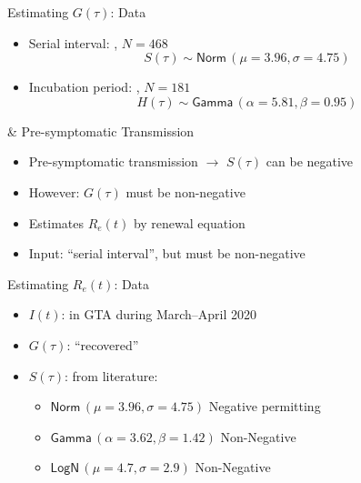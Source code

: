 \documentclass[aspectratio=169,professionalfonts]{beamer}
\begin{document}
\begin{frame}{Estimating $G(\tau)$: Data}
  \begin{itemize}
    \item Serial interval: \textcite{Du2020}, $N = 468$
    \begin{equation*}
      S(\tau) \sim \mathsf{Norm\,(\mu=3.96, \sigma=4.75)}
    \end{equation*}
    \item Incubation period: \textcite{Lauer2020}, $N = 181$
    \begin{equation*}
      H(\tau) \sim \mathsf{Gamma}\,(\alpha=5.81, \beta=0.95)
    \end{equation*}
  \end{itemize}
\end{frame}
\begin{frame}{\covid \& Pre-symptomatic Transmission}
  \begin{itemize}
    \item Pre-symptomatic transmission $\rightarrow$ $S(\tau)$ can be negative
    \item However: $G(\tau)$ must be non-negative
  \end{itemize}
  \pause
  \begin{itemize}
    \item Estimates $R_e(t)$ by renewal equation
    \item Input: ``serial interval'', but must be non-negative
  \end{itemize}
\end{frame}
\begin{frame}{Estimating $R_e(t)$: Data}
  \begin{itemize}
    \item $I(t)$: \covid in GTA during March--April 2020\\[1em]
    \pause
    \item $G(\tau)$: ``recovered''\\[1em]
    \item $S(\tau)$: from literature:
    \begin{itemize}
      \item $\mathsf{Norm\,(\mu=3.96, \sigma=4.75)}$    \textcite{Du2020}Negative permitting
      \item $\mathsf{Gamma\,(\alpha=3.62, \beta=1.42)}$ \textcite{Zhang2020}Non-Negative
      \item $\mathsf{LogN\,(\mu=4.7, \sigma=2.9)}$      \textcite{Nishiura2020}Non-Negative
    \end{itemize}
  \end{itemize}
\end{frame}
\end{document}
